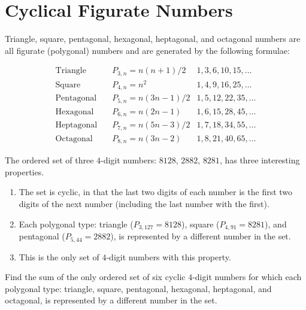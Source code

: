 \chapter{Cyclical Figurate Numbers}
Triangle, square, pentagonal, hexagonal, heptagonal, and octagonal numbers are all figurate (polygonal) numbers and are
generated by the following formulae:

\begin{align*}
	\text{Triangle}\quad   & P_{3,n} = n(n + 1)/2  & 1,3,6,10,15,\dots  \\
	\text{Square}\quad     & P_{4,n} = n^2         & 1,4,9,16,25,\dots  \\
	\text{Pentagonal}\quad & P_{5,n} = n(3n - 1)/2 & 1,5,12,22,35,\dots \\
	\text{Hexagonal}\quad  & P_{6,n} = n(2n - 1)   & 1,6,15,28,45,\dots \\
	\text{Heptagonal}\quad & P_{7,n} = n(5n -3)/2  & 1,7,18,34,55,\dots \\
	\text{Octagonal}\quad  & P_{8,n} = n(3n -2)    & 1,8,21,40,65,\dots
\end{align*}

The ordered set of three $4$-digit numbers: $8128$, $2882$, $8281$, has three interesting properties.

\begin{enumerate}
	\item The set is cyclic, in that the last two digits of each number is the first two digits of the next number
		(including the last number with the first).
	\item Each polygonal type: triangle ($P_{3,127} = 8128$), square ($P_{4,91} = 8281$), and pentagonal ($P_{5,44} =
		2882$), is represented by a different number in the set.
	\item	This is the only set of $4$-digit numbers with this property.
\end{enumerate}
Find the sum of the only ordered set of six cyclic $4$-digit numbers for which each polygonal type: triangle, square,
pentagonal, hexagonal, heptagonal, and octagonal, is represented by a different number in the set.
